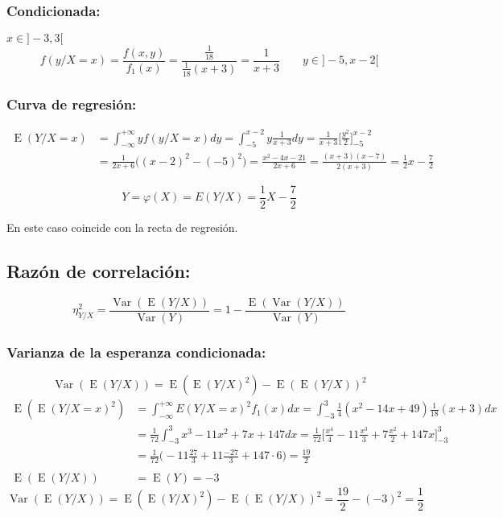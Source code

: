 \documentclass[tikz]{article}
\DeclareMathOperator{\Var}{Var}
\DeclareMathOperator{\E}{E}
\begin{document}
\subsubsection*{Condicionada:}
$x\in]-3,3[$
\[f(y/X=x)=\frac{f(x,y)}{f_1(x)}=\frac{\frac{1}{18}}{\frac{1}{18}(x+3)}=\frac{1}{x+3} \qquad y\in]-5,x-2[\]

\subsubsection*{Curva de regresión:}

\begin{align*}
  \E(Y/X=x)&=\int_{-\infty}^{+\infty}yf(y/X=x)dy=\int_{-5}^{x-2}y\frac{1}{x+3}dy=\frac{1}{x+3}\bigg[\frac{y^2}{2}\bigg]_{-5}^{x-2} \\
                  &=\frac{1}{2x+6}\Big((x-2)^2-(-5)^2\Big)=\frac{x^2-4x-21}{2x+6}=\frac{(x+3)(x-7)}{2(x+3)}=\frac{1}{2}x-\frac{7}{2}
\end{align*}

\[Y=\varphi(X)=E(Y/X)=\frac{1}{2}X-\frac{7}{2}\]

En este caso coincide con la recta de regresión.

\subsection*{Razón de correlación:}

\[\eta_{Y/X}^2=\frac{\Var(\E(Y/X))}{\Var(Y)}=1-\frac{\E(\Var(Y/X))}{\Var(Y)}\]

\subsubsection*{Varianza de la esperanza condicionada:}

\[\Var(\E(Y/X))=\E(\E(Y/X)^2)-\E(\E(Y/X))^2\]
\begin{align*}
  \E(\E(Y/X=x)^2)&=\int_{-\infty}^{+\infty}E(Y/X=x)^2f_1(x)dx=\int_{-3}^{3}\frac{1}{4}(x^2-14x+49)\frac{1}{18}(x+3)dx \\
                 &=\frac{1}{72}\int_{-3}^{3}x^3-11x^2+7x+147dx=\frac{1}{72}\bigg[\frac{x^4}{4}-11\frac{x^3}{3}+7\frac{x^2}{2}+147x\bigg]_{-3}^{3} \\
                 &=\frac{1}{72}\bigg(-11\frac{27}{3}+11\frac{-27}{3}+147 \cdot 6\bigg)=\frac{19}{2} \\
  ~ \\
  \E(\E(Y/X))&=\E(Y)=-3                 
\end{align*}
\[\Var(\E(Y/X))=\E(\E(Y/X)^2)-\E(\E(Y/X))^2=\frac{19}{2}-(-3)^2=\frac{1}{2}\]
\end{document}
